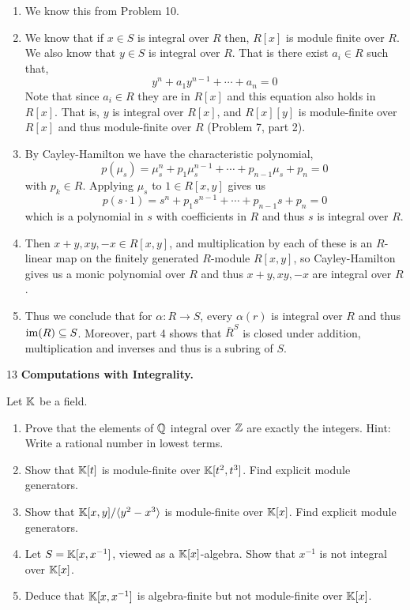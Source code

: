 \documentclass[Notebook.tex]{subfiles}
\begin{document}
\begin{solution}
    \bbni 
    \begin{enumerate}
        \item We know this from Problem 10. 
        
        \item We know that if $x \in S$ is integral over $R$ then, $R[x]$ is module finite over $R$. We also know that $y \in S$ is integral over $R$. That is there exist $a_i \in R$ such that, 
        \[y^n + a_1y^{n-1} + \cdots + a_n = 0\]
        Note that since $a_i \in R$ they are in $R[x]$ and this equation also holds in $R[x]$. That is, $y$ is integral over $R[x]$, and $R[x][y]$ is module-finite over $R[x]$ and thus module-finite over $R$ (Problem 7, part 2). 

        \item By Cayley-Hamilton we have the characteristic polynomial, 
        \[p(\mu_s) = \mu_s^n + p_1\mu_s^{n-1} + \cdots + p_{n-1}\mu_s + p_n = 0\]
        with $p_k \in R$. Applying $\mu_s$ to $1 \in R[x,y]$ gives us
        \[p(s \cdot 1) = s^n + p_1s^{n-1} + \cdots + p_{n-1}s + p_n = 0\]
        which is a polynomial in $s$ with coefficients in $R$ and thus $s$ is integral over $R$. 

        \item Then $x+y, xy, -x \in R[x,y]$, and multiplication by each of these is an $R$-linear map on the finitely generated  $R$-module $R[x,y]$, so Cayley-Hamilton gives us a monic polynomial over $R$ and thus $x+y, xy, -x$ are integral over $R$. 
        
        \item Thus we conclude that for $\alpha: R \to S$, every $\alpha(r)$ is integral over $R$ and thus $ \operatorname{im}(R) \subseteq S$. Moreover, part 4 shows that $\overline{R}^S$ is closed under addition, multiplication and inverses and thus is a subring of $S$. 
    \end{enumerate}
\end{solution}

\newpage 

\begin{problem}{13}
    \textbf{Computations with Integrality.} 
    
    Let $\mathbb K$ be a field.
    \begin{enumerate}
        \item Prove that the elements of $\mathbb Q$ integral over $\mathbb Z$ are exactly the integers. Hint: Write a rational number in lowest terms.
        \item Show that $\mathbb K[t]$ is module-finite over $\mathbb K[t^2,t^3]$. Find explicit module generators.
        \item Show that $\mathbb K[x,y]/\langle y^2-x^3\rangle$ is module-finite over $\mathbb K[x]$. Find explicit module generators.
        \item Let $S=\mathbb K[x,x^{-1}]$, viewed as a $\mathbb K[x]$-algebra. Show that $x^{-1}$ is not integral over $\mathbb K[x]$.
        \item Deduce that $\mathbb K[x,x^{-1}]$ is algebra-finite but not module-finite over $\mathbb K[x]$.
    \end{enumerate}
\end{problem}
\end{document}
